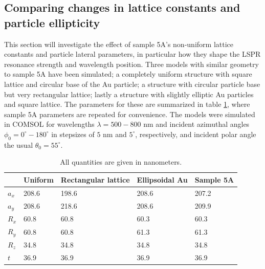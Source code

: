 \subsection{Comparing changes in lattice constants and particle ellipticity}
\label{sec:results_S5A_comparisons}
This section will investigate the effect of sample 5A's non-uniform lattice constants and particle lateral parameters, in particular how they shape the LSPR resonance strength and wavelength position. Three models with similar geometry to sample 5A have been simulated; a completely uniform structure with square lattice and circular base of the Au particle; a structure with circular particle base but very rectangular lattice; lastly a structure with slightly elliptic Au particles and square lattice. The parameters for these are summarized in table \ref{tab:S5A_comparisons}, where sample 5A parameters are repeated for convenience. The models were simulated in COMSOL for wavelengths $\lambda=500-800$ nm and incident azimuthal angles $\phi_0=0^\circ-180^\circ$ in stepsizes of $5$ nm and $5^\circ$, respectively, and incident polar angle the usual $\theta_0=55^\circ$.
\begin{table}[h]
\centering
\caption{All quantities are given in nanometers.}
\label{tab:S5A_comparisons}
\begin{tabular}{l l l l l}
            &   Uniform    &   Rectangular lattice   &   Ellipsoidal Au   & Sample 5A\\
    \hline 
    $a_x$   &   208.6      &   198.6           &   208.6    &   207.2       \\
    $a_y$   &   208.6       &   218.6           &   208.6   &   209.9  \\
    $R_x$   &   60.8           &   60.8           &   60.3  &   60.3     \\
    $R_y$   &   60.8           &   60.8           &   61.3  &   61.3 \\
    $R_z$   &   34.8           &   34.8           &   34.8  &   34.8    \\
    $t$     &   36.9           &   36.9           &   36.9  &   36.9    \\
    \hline
\end{tabular}
\end{table}

